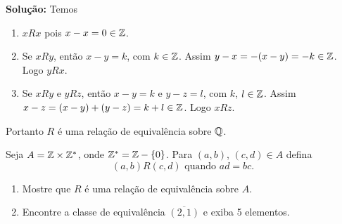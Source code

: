 \documentclass[12pt]{article}
\begin{document}
\noindent\textbf{Solu\c{c}\~ao:} Temos
\begin{enumerate}[label={\roman*})]
	\item $xRx$ pois $x - x = 0 \in \mathbb{Z}$.
	\item Se $xRy$, então $x - y = k$, com $k \in \mathbb{Z}$. Assim $y - x = -(x - y) = -k \in \mathbb{Z}$. Logo $yRx$.
	\item Se $xRy$ e $yRz$, então $x - y = k$ e $y - z = l$, com $k$, $l \in \mathbb{Z}$. Assim $x - z = (x - y) + (y - z) = k + l \in \mathbb{Z}$. Logo $xRz$.
\end{enumerate}

Portanto $R$ é uma relação de equivalência sobre $\mathbb{Q}$.


\vspace{.5cm}

\questao Seja $A = \mathbb{Z} \times \mathbb{Z}^*$, onde $\mathbb{Z}^* = \mathbb{Z} - \{0\}$. Para $(a,b)$, $(c,d) \in A$ defina
\[
	(a,b)R(c,d) \mbox{ quando } ad=bc.
\]

\begin{enumerate}[label={\alph*})]
	\item Mostre que $R$ é uma rela{\c c}{\~a}o de equival{\^e}ncia sobre $A$.
	\item Encontre a classe de equivalência $\overline{(2,1)}$ e exiba 5 elementos.
\end{enumerate}
\end{document}
